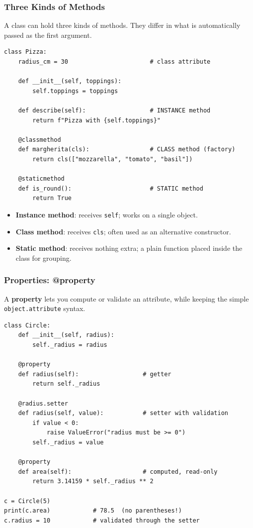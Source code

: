 \documentclass[aspectratio=169,10pt]{beamer}
\newcommand{\keyword}[1]{\textcolor{PrimaryBlue}{\textbf{#1}}}
\newcommand{\codeword}[1]{\texttt{#1}}
\begin{document}
\begin{frame}[fragile]
\frametitle{Three Kinds of Methods}
\small
A class can hold three kinds of methods. They differ in what is automatically passed as the first argument.

\vspace{0.12cm}
\begin{lstlisting}[style=pycode]
class Pizza:
    radius_cm = 30                       # class attribute

    def __init__(self, toppings):
        self.toppings = toppings

    def describe(self):                  # INSTANCE method
        return f"Pizza with {self.toppings}"

    @classmethod
    def margherita(cls):                 # CLASS method (factory)
        return cls(["mozzarella", "tomato", "basil"])

    @staticmethod
    def is_round():                      # STATIC method
        return True
\end{lstlisting}

\begin{itemize}\setlength\itemsep{0.04cm}
  \item \keyword{Instance method}: receives \codeword{self}; works on a single object.
  \item \keyword{Class method}: receives \codeword{cls}; often used as an alternative constructor.
  \item \keyword{Static method}: receives nothing extra; a plain function placed inside the class for grouping.
\end{itemize}
\end{frame}


\begin{frame}[fragile]
\frametitle{Properties: @property}
\small
A \keyword{property} lets you compute or validate an attribute, while keeping the simple \codeword{object.attribute} syntax.

\vspace{0.12cm}
\begin{lstlisting}[style=pycode]
class Circle:
    def __init__(self, radius):
        self._radius = radius

    @property
    def radius(self):                  # getter
        return self._radius

    @radius.setter
    def radius(self, value):           # setter with validation
        if value < 0:
            raise ValueError("radius must be >= 0")
        self._radius = value

    @property
    def area(self):                    # computed, read-only
        return 3.14159 * self._radius ** 2

c = Circle(5)
print(c.area)            # 78.5  (no parentheses!)
c.radius = 10            # validated through the setter
\end{lstlisting}
\end{frame}
\end{document}

